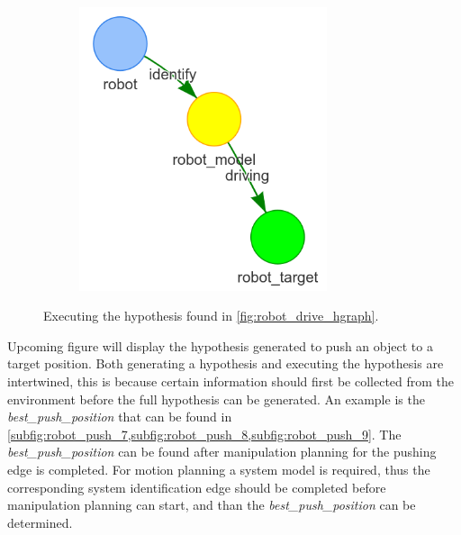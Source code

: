 \begin{figure}[H]
\begin{subfigure}{.3\textwidth}
    \end{subfigure}
    \begin{subfigure}{.3\textwidth}
    \centering
    \includegraphics[width=0.8\textwidth]{figures/connecting_nodes/robot_to_target/execute_robot_to_target_3}
    \end{subfigure}
    \caption{Executing the hypothesis found in \cref{fig:robot_drive_hgraph}.}
    \label{fig:execute_robot_to_target}
\end{figure}

Upcoming figure will display the hypothesis generated to push an object to a target position. Both generating a hypothesis and executing the hypothesis are intertwined, this is because certain information should first be collected from the environment before the full hypothesis can be generated. An example is the \textit{best\_push\_position} that can be found in \cref{subfig:robot_push_7,subfig:robot_push_8,subfig:robot_push_9}. The \textit{best\_push\_position} can be found after manipulation planning for the pushing edge is completed. For motion planning a system model is required, thus the corresponding system identification edge should be completed before manipulation planning can start, and than the \textit{best\_push\_position} can be determined.\bs

